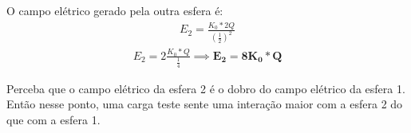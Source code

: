 \documentclass[12pt]{extarticle}
\newcommand{\<}{\langle}
\renewcommand{\>}{\rangle}
\theoremstyle{definition}
\begin{document}
\begin{enumerate}
     O campo elétrico gerado pela outra esfera é:
     \begin{align*}
         E_{2} =\frac{K_{0}*2Q}{(\frac{1}{2})^{2}}
     \end{align*}
     \begin{align*}
         E_{2} = 2\frac{K_{0}*Q}{\frac{1}{4}} \implies \mathbf{E_{2}=8K_{0}*Q}
     \end{align*}
     
     Perceba que o campo elétrico da esfera 2 é o dobro do campo elétrico da esfera 1. Então nesse ponto, uma carga teste sente uma interação maior com a esfera 2 do que com a esfera 1.


 \end{enumerate}
\end{document}
